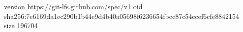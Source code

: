 version https://git-lfs.github.com/spec/v1
oid sha256:7e6169da1ec290b1b44e9d4b40a05698f6236654fbcc87c54ccef6cfe8842154
size 196704
